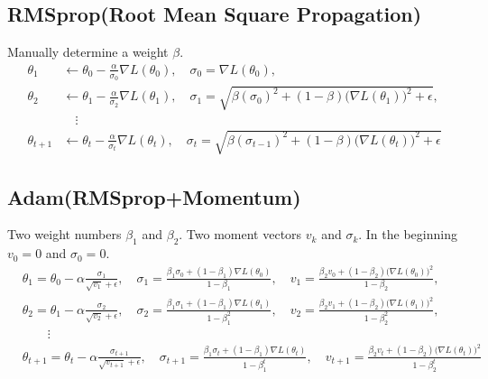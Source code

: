 \documentclass{article}
\begin{document}
        \subsection{RMSprop(Root Mean Square Propagation)}
            Manually determine a weight $\beta$.
            \begin{align*}
                \theta_1 & \leftarrow \theta_0 - \frac{\alpha}{\sigma_0}\nabla L(\theta_{0}),\quad\sigma_0 = \nabla L(\theta_{0}), \\
                \theta_2 & \leftarrow \theta_1 - \frac{\alpha}{\sigma_2}\nabla L(\theta_{1}),\quad\sigma_1 = \sqrt{\beta(\sigma_0)^2 + (1-\beta)\big(\nabla L(\theta_{1})\big)^2 + \epsilon}, \\
                         &\quad\vdots\\
                \theta_{t+1} & \leftarrow \theta_t - \frac{\alpha}{\sigma_t}\nabla L(\theta_{t}),\quad\sigma_t = \sqrt{\beta(\sigma_{t-1})^2+(1-\beta)\big(\nabla L(\theta_{t})\big)^2 + \epsilon}
            \end{align*}
        \subsection{Adam(RMSprop+Momentum)}
            Two weight numbers $\beta_1$ and $\beta_2$.  Two moment vectors $v_k$ and $\sigma_k$. In the beginning $v_0=0$ and $\sigma_0=0$.
            \begin{align*}
                &\theta_1 = \theta_0 - \alpha\frac{\sigma_1}{\sqrt{v_1}+\epsilon},\quad\sigma_1 = \frac{\beta_1\sigma_0+(1-\beta_1)\nabla L(\theta_0)}{1-\beta_1},\quad v_1=\frac{\beta_2 v_0+(1-\beta_2)\big(\nabla L(\theta_0)\big)^2}{1-\beta_2}, \\
                &\theta_2 = \theta_1 - \alpha\frac{\sigma_2}{\sqrt{v_2}+\epsilon},\quad\sigma_2=\frac{\beta_1\sigma_1+(1-\beta_1)\nabla L(\theta_1)}{1-\beta_1^2},\quad v_2 = \frac{\beta_2 v_1+(1-\beta_2)\big(\nabla L(\theta_1)\big)^2}{1-\beta_2^2}, \\
                    &\qquad\vdots\\
                &\theta_{t+1}=\theta_t-\alpha\frac{\sigma_{t+1}}{\sqrt{v_{t+1}}+\epsilon},\quad\sigma_{t+1}=\frac{\beta_1\sigma_t+(1-\beta_1)\nabla L(\theta_t)}{1-\beta_1^t},\quad v_{t+1}=\frac{\beta_2 v_t+(1-\beta_2)\big(\nabla L(\theta_t)\big)^2}{1-\beta_2^t}
            \end{align*}
        
\end{document}
